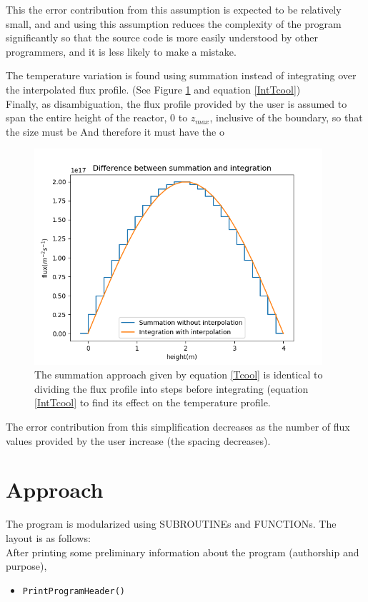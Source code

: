 \documentclass[a4paper, 12pt]{article}
\begin{document}
This the error contribution from this assumption is expected to be relatively small, and and using this assumption reduces the complexity of the program significantly so that the source code is more easily understood by other programmers, and it is less likely to make a mistake.

The temperature variation is found using summation instead of integrating over the interpolated flux profile. (See Figure \ref{OnlyPicture} and equation \ref{IntTcool})\\

Finally, as disambiguation, the flux profile provided by the user is assumed to span the entire height of the reactor, 0 to $z_{max}$, inclusive of the boundary, so that the size must be 
And therefore it must have the o	
\begin{figure}[!h]
\centering
\includegraphics[height=8cm]{SumVsInt.png}
\caption{The summation approach given by equation \ref{Tcool} is identical to dividing the flux profile into steps before integrating (equation \ref{IntTcool} to find its effect on the temperature profile.}\label{OnlyPicture}
\end{figure}

The error contribution from this simplification decreases as the number of flux values provided by the user increase (the spacing decreases).

\section{Approach}
The program is modularized using \textcolor{subr}{SUBROUTINE}s and \textcolor{func}{FUNCTION}s. The layout is as follows:\\

After printing some preliminary information about the program (authorship and purpose),
\begin{itemize}
	\item \texttt{\textcolor{subr}{PrintProgramHeader}()}
\end{itemize}
\end{document}

